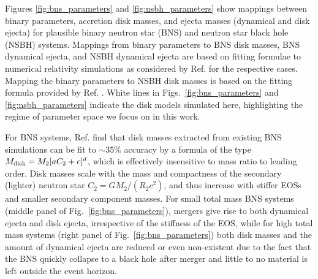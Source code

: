 Figures \ref{fig:bns_parameters} and \ref{fig:nsbh_parameters} show mappings between binary parameters, accretion disk masses, and ejecta masses (dynamical and disk ejecta) for plausible binary neutron star (BNS) and neutron star black hole (NSBH) systems. Mappings from binary parameters to BNS disk masses, BNS dynamical ejecta, and NSBH dynamical ejecta are based on fitting formulae to numerical relativity simulations as considered by Ref. \cite{kruger_2020} for the respective cases. Mapping the binary parameters to NSBH disk masses is based on the fitting formula provided by Ref. \cite{foucart_remnant_2018}. White lines in Figs.~\ref{fig:bns_parameters} and \ref{fig:nsbh_parameters} indicate the disk models simulated here, highlighting the regime of parameter space we focus on in this work.

For BNS systems, Ref. \cite{kruger_2020} find that disk masses extracted from existing BNS simulations can be fit to $\sim35\%$ accuracy by a formula of the type $M_{\rm disk}=M_2[aC_2 +c]^d$, which is effectively insensitive to mass ratio to leading order. Disk masses scale with the mass and compactness of the secondary (lighter) neutron star $C_2 = GM_2/(R_2c^2)$, and thus increase with stiffer EOSs and smaller secondary component masses. For small total mass BNS systems (middle panel of Fig.~\ref{fig:bns_parameters}), mergers give rise to both dynamical ejecta and disk ejecta, irrespective of the stiffness of the EOS, while for high total mass systems (right panel of Fig.~\ref{fig:bns_parameters}) both disk masses and the amount of dynamical ejecta are reduced or even non-existent due to the fact that the BNS quickly collapse to a black hole after merger and little to no material is left outside the event horizon. 

